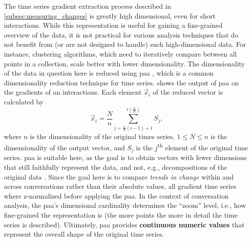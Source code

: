 The time series gradient extraction process described in \cref{subsec:measuring_changes} is greatly high dimensional, even for short interactions.
While this representation is useful for gaining a fine-grained overview of the data, it is not practical for various analysis techniques that do not benefit from (or are not designed to handle) such high-dimensional data.
For instance, clustering algorithms, which need to iteratively compare between all points in a collection, scale better with lower dimensionality.
The dimensionality of the data in question here is reduced using \acl{paa} \citep[\acl{paa};][]{Keogh2001dimensionality}, which is a common dimensionality reduction technique for time series.
 shows the output of \ac{paa} on the gradients of an interactions.
Each element $\vec{x}_i$ of the reduced vector is calculated by
%
\begin{equation}
	\label{eq:paa}
	\vec{x}_i = \frac{N}{n} \sum_{j=\frac{n}{N}(i-1)+1}^{i(\frac{n}{N})} S_j,
\end{equation}
\noindent
%
where $n$ is the dimensionality of the original times series, $1 \leq N \leq n$ is the dimensionality of the output vector, and $S_j$ is the $j$\textsuperscript{th} element of the original time series.
\Ac{paa} is suitable here, as the goal is to obtain vectors with fewer dimensions that still faithfully represent the data, and not, e.g., decompositions of the original data \citep[cf.\ method survey in][pp.~271-275]{Keogh2001dimensionality}.
Since the goal here is to compare \emph{trends in change} within and across conversations rather than their absolute values, all gradient time series where z-normalized before applying the \ac{paa}.
In the context of conversation analysis, the \ac{paa}'s dimensional cardinality determines the \enquote{zoom} level, i.e., how fine-grained the representation is (the more points the more in detail the time series is described).
Ultimately, \ac{paa} provides \textbf{continuous numeric values} that represent the overall shape of the original time series.

